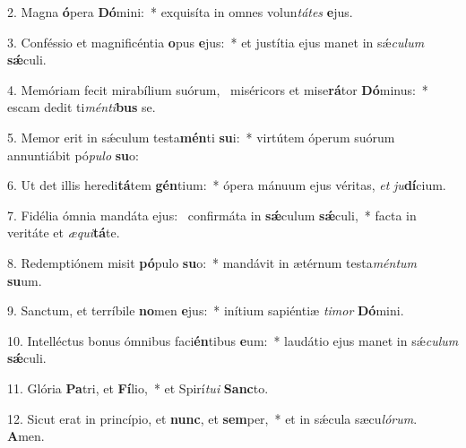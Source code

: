 2. Magna \textbf{ó}pera \textbf{Dó}mini:~*  exquisíta in omnes volun\textit{tá}\textit{tes} \textbf{e}jus.\

3. Conféssio et magnificéntia \textbf{o}pus \textbf{e}jus:~*  et justítia ejus manet in sǽ\textit{cu}\textit{lum} \textbf{sǽ}culi.\

4. Memóriam fecit mirabílium suórum, \dag\  miséricors et mise\textbf{rá}tor \textbf{Dó}minus:~*  escam dedit ti\textit{mén}\textit{ti}\textbf{bus} se.\

5. Memor erit in sǽculum testa\textbf{mén}ti \textbf{su}i:~*  virtútem óperum suórum annuntiábit pó\textit{pu}\textit{lo} \textbf{su}o:\

6. Ut det illis heredi\textbf{tá}tem \textbf{gén}tium:~*  ópera mánuum ejus véritas, \textit{et} \textit{ju}\textbf{dí}cium.\

7. Fidélia ómnia mandáta ejus: \dag\  confirmáta in \textbf{sǽ}culum \textbf{sǽ}culi,~*  facta in veritáte et \textit{æ}\textit{qui}\textbf{tá}te.\

8. Redemptiónem misit \textbf{pó}pulo \textbf{su}o:~*  mandávit in ætérnum testa\textit{mén}\textit{tum} \textbf{su}um.\

9. Sanctum, et terríbile \textbf{no}men \textbf{e}jus:~*  inítium sapiéntiæ \textit{ti}\textit{mor} \textbf{Dó}mini.\

10. Intelléctus bonus ómnibus faci\textbf{én}tibus \textbf{e}um:~*  laudátio ejus manet in sǽ\textit{cu}\textit{lum} \textbf{sǽ}culi.\

11. Glória \textbf{Pa}tri, et \textbf{Fí}lio,~*  et Spirí\textit{tu}\textit{i} \textbf{Sanc}to.\

12. Sicut erat in princípio, et \textbf{nunc}, et \textbf{sem}per,~*  et in sǽcula sæcu\textit{ló}\textit{rum}. \textbf{A}men.\

